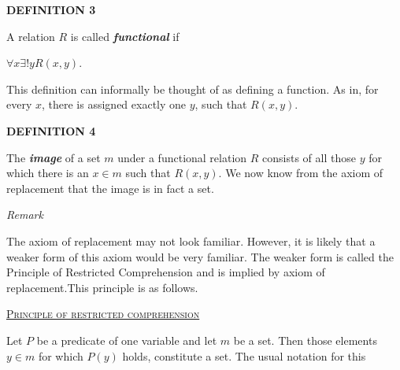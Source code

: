 \documentclass[12pt, a4paper]{article}
\begin{document}
\noindent\textbf{DEFINITION 3}\par

\vspace{4mm}

A relation $R$ is called \textbf{\textit{functional}} if\par

\vspace{4mm}

\centerline{$\forall x\exists! y R(x,y)$.}

\vspace{4mm}

\noindent This definition can informally be thought of as defining a function. As in, for every $x$, there is assigned exactly one $y$, such that $R(x,y)$.\par

\newpage

\noindent\textbf{DEFINITION 4}\par

\vspace{4mm}

The \textbf{\textit{image}} of a set $m$ under a functional relation $R$ consists of all those $y$ for which there is an $x\in m$ such that $R(x,y)$. We now know from the axiom of replacement that the image is in fact a set.

\vspace{6mm}

\noindent\large{\textit{Remark}}\normalsize

\vspace{4mm}

\noindent The axiom of replacement may not look familiar. However, it is likely that a weaker form of this axiom would be very familiar. The weaker form is called the Principle of Restricted Comprehension and is implied by axiom of replacement.This principle is as follows.\par

\vspace{6mm}

\noindent\textsc{\underline{Principle of restricted comprehension}}\par

\vspace{4mm}

Let $P$ be a predicate of one variable and let $m$ be a set. Then those elements $y\in m$ for which $P(y)$ holds, constitute a set. The usual notation for this\par
\end{document}
